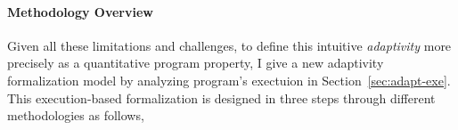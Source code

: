 \paragraph{Methodology Overview}
Given all these limitations and challenges,
to define this intuitive \emph{adaptivity} more precisely as a quantitative program property, 
I give a new adaptivity formalization model by analyzing program's exectuion in Section~\ref{sec:adapt-exe}.
 This execution-based formalization is designed in three steps through different methodologies as follows,

